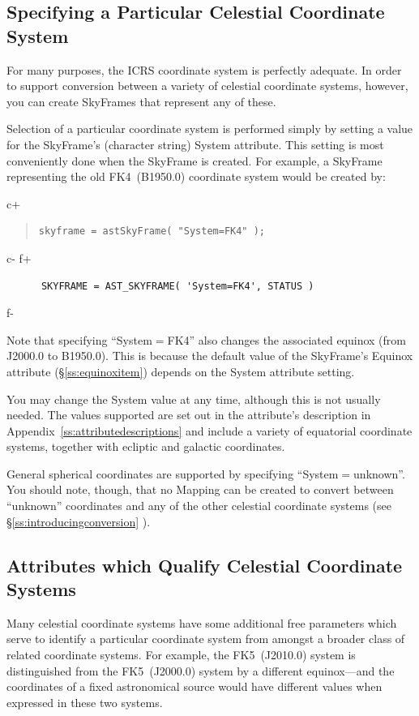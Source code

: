 \documentclass[twoside,11pt]{article}
\newcommand{\appref}[1]{Appendix~\ref{#1}}
\newcommand{\secref}[1]{\S\ref{#1}}
\newcommand{\appref}[1]{\ref{#1}}
\newcommand{\secref}[1]{\ref{#1}}
\begin{document}
\subsection{Specifying a Particular Celestial Coordinate System}

For many purposes, the ICRS coordinate system is perfectly
adequate. In order to support conversion between a variety of
celestial coordinate systems, however, you can create SkyFrames that
represent any of these.

Selection of a particular coordinate system is performed simply by
setting a value for the SkyFrame's (character string) System
attribute. This setting is most conveniently done when the SkyFrame is
created. For example, a SkyFrame representing the old FK4~(B1950.0)
coordinate system would be created by:

c+
\begin{quote}
\small
\begin{verbatim}
skyframe = astSkyFrame( "System=FK4" );
\end{verbatim}
\normalsize
\end{quote}
c-
f+
\small
\begin{verbatim}
      SKYFRAME = AST_SKYFRAME( 'System=FK4', STATUS )
\end{verbatim}
\normalsize
f-

Note that specifying ``System$=$FK4'' also changes the associated
equinox (from J2000.0 to B1950.0). This is because the default value
of the SkyFrame's Equinox attribute (\secref{ss:equinoxitem}) depends
on the System attribute setting.

You may change the System value at any time, although this is not
usually needed.  The values supported are set out in the attribute's
description in \appref{ss:attributedescriptions} and include a variety
of equatorial coordinate systems, together with ecliptic and galactic
coordinates.

General spherical coordinates are supported by specifying
``System$=$unknown''. You should note, though, that no Mapping can be
created to convert between ``unknown'' coordinates and any of the other
celestial coordinate systems (see \secref{ss:introducingconversion} ).

\subsection{Attributes which Qualify Celestial Coordinate Systems}

Many celestial coordinate systems have some additional free parameters
which serve to identify a particular coordinate system from amongst a
broader class of related coordinate systems. For example, the
FK5~(J2010.0) system is distinguished from the FK5~(J2000.0)
system by a different equinox---and the coordinates of a fixed
astronomical source would have different values when expressed in
these two systems.
\end{document}
